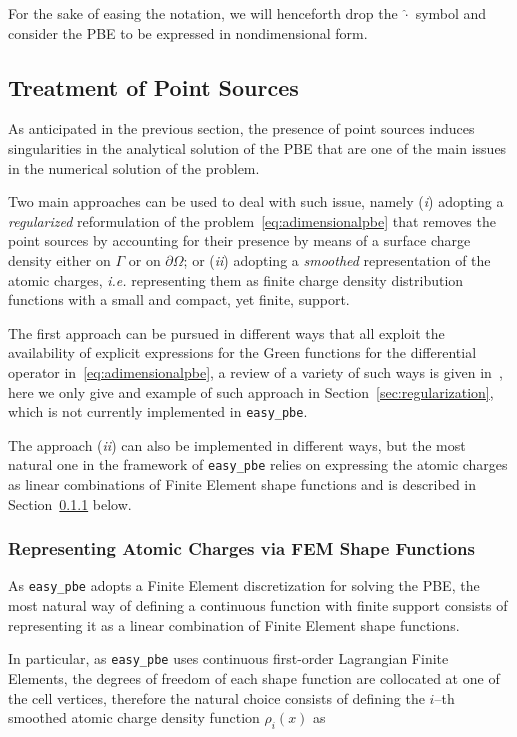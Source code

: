 \documentclass[11pt,a4paper]{article}
\begin{document}
For the sake of easing the notation, we will henceforth drop the $\hat{\cdot}$ symbol
and consider the PBE to be expressed in nondimensional form.

\subsection{Treatment of Point Sources}
\label{sec:point_sources}
As anticipated in the previous section, the presence of point sources induces 
singularities in the analytical solution of the PBE that are one of the main
issues in the numerical solution of the problem.

Two main approaches can be used to deal with such issue, namely ({\it i}) adopting
a \emph{regularized} reformulation of the problem~\eqref{eq:adimensionalpbe} that removes
the point sources by accounting for their presence by means of a surface charge density 
either on $\Gamma$ or on $\partial \Omega$; or ({\it ii}) adopting a \emph{smoothed} representation of the atomic charges, {\it i.e.} representing them as finite charge density
distribution functions with a small and compact, yet finite, support.

The first approach can be pursued in different ways that all exploit the availability of explicit expressions for the Green functions for the differential operator in~\eqref{eq:adimensionalpbe}, a review of a variety of such ways is given in~\cite{ref16}, here we only give and example of such approach in Section~\ref{sec:regularization}, which is not currently implemented in {\tt easy\_pbe}.

The approach ({\it ii}) can also be implemented in different ways, 
but the most natural one in the framework of {\tt easy\_pbe} relies on
expressing the atomic charges as linear combinations of Finite Element shape
functions and is described in Section~\ref{sec:chargedeposition} below.

\subsubsection{Representing Atomic Charges via FEM Shape Functions}
\label{sec:chargedeposition}

As {\tt easy\_pbe} adopts a Finite Element discretization for solving the
PBE, the most natural way of defining a continuous function with finite
support consists of representing it as a linear combination of Finite Element
shape functions.

In particular, as {\tt easy\_pbe} uses continuous first-order Lagrangian Finite 
Elements, the degrees of freedom of each shape function are collocated at one
of the cell vertices, therefore the natural choice consists of defining 
the $i$--th smoothed atomic charge density function $\rho_i(x)$ as
\end{document}
